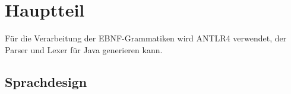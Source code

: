 \documentclass[../InterneDSLs.tex]{subfiles}
\begin{document}
\section{Hauptteil}
Für die Verarbeitung der \ac{EBNF}-Grammatiken wird ANTLR4 verwendet, der Parser und Lexer für Java generieren kann.

\subsection{Sprachdesign}
\end{document}
